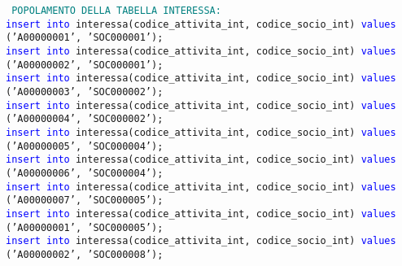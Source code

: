 \documentclass{article}
\begin{document}
    \begin{flushleft}
        \texttt{
        \textcolor{teal}{POPOLAMENTO DELLA TABELLA INTERESSA:} \\
        \hspace*{0.5em}\textcolor{blue}{insert into} interessa(codice\_attivita\_int, codice\_socio\_int) \textcolor{blue}{values} \hspace*{0.5em}('A00000001', 'SOC000001'); \\
        \hspace*{0.5em}\textcolor{blue}{insert into} interessa(codice\_attivita\_int, codice\_socio\_int) \textcolor{blue}{values} \hspace*{0.5em}('A00000002', 'SOC000001'); \\
        \hspace*{0.5em}\textcolor{blue}{insert into} interessa(codice\_attivita\_int, codice\_socio\_int) \textcolor{blue}{values} \hspace*{0.5em}('A00000003', 'SOC000002'); \\
        \hspace*{0.5em}\textcolor{blue}{insert into} interessa(codice\_attivita\_int, codice\_socio\_int) \textcolor{blue}{values} \hspace*{0.5em}('A00000004', 'SOC000002'); \\
        \hspace*{0.5em}\textcolor{blue}{insert into} interessa(codice\_attivita\_int, codice\_socio\_int) \textcolor{blue}{values} \hspace*{0.5em}('A00000005', 'SOC000004'); \\
        \hspace*{0.5em}\textcolor{blue}{insert into} interessa(codice\_attivita\_int, codice\_socio\_int) \textcolor{blue}{values} \hspace*{0.5em}('A00000006', 'SOC000004'); \\
        \hspace*{0.5em}\textcolor{blue}{insert into} interessa(codice\_attivita\_int, codice\_socio\_int) \textcolor{blue}{values} \hspace*{0.5em}('A00000007', 'SOC000005'); \\
        \hspace*{0.5em}\textcolor{blue}{insert into} interessa(codice\_attivita\_int, codice\_socio\_int) \textcolor{blue}{values} \hspace*{0.5em}('A00000001', 'SOC000005'); \\
        \hspace*{0.5em}\textcolor{blue}{insert into} interessa(codice\_attivita\_int, codice\_socio\_int) \textcolor{blue}{values} \hspace*{0.5em}('A00000002', 'SOC000008'); \\
}
\end{flushleft}
\end{document}
